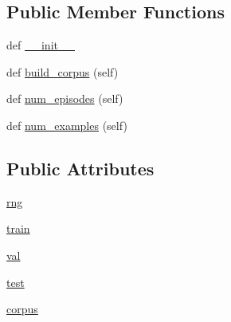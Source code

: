 \subsection*{Public Member Functions}
\begin{DoxyCompactItemize}
\item 
def \hyperlink{classparlai_1_1tasks_1_1integration__tests_1_1agents_1_1CandidateBaseTeacher_a0b4a597b51cf2901e3af2dc59c41f137}{\+\_\+\+\_\+init\+\_\+\+\_\+}
\item 
def \hyperlink{classparlai_1_1tasks_1_1integration__tests_1_1agents_1_1CandidateBaseTeacher_acc36b2f9fb42b69b2e0da43f398fdb47}{build\+\_\+corpus} (self)
\item 
def \hyperlink{classparlai_1_1tasks_1_1integration__tests_1_1agents_1_1CandidateBaseTeacher_aea8447f8dee0c3e60e0f4a444a01e239}{num\+\_\+episodes} (self)
\item 
def \hyperlink{classparlai_1_1tasks_1_1integration__tests_1_1agents_1_1CandidateBaseTeacher_afff9316bcd22ef04a25e4325cedd2ba8}{num\+\_\+examples} (self)
\end{DoxyCompactItemize}
\subsection*{Public Attributes}
\begin{DoxyCompactItemize}
\item 
\hyperlink{classparlai_1_1tasks_1_1integration__tests_1_1agents_1_1CandidateBaseTeacher_a699eabf88ee7fb37dd9b3ba8c4063767}{rng}
\item 
\hyperlink{classparlai_1_1tasks_1_1integration__tests_1_1agents_1_1CandidateBaseTeacher_a5d675561a479866e7fea8ba46d703745}{train}
\item 
\hyperlink{classparlai_1_1tasks_1_1integration__tests_1_1agents_1_1CandidateBaseTeacher_a1c0f73c0e8e5137f9458a7ce9863a7b6}{val}
\item 
\hyperlink{classparlai_1_1tasks_1_1integration__tests_1_1agents_1_1CandidateBaseTeacher_a7667cabd8cd90f2c8ef775d651cb7e2e}{test}
\item 
\hyperlink{classparlai_1_1tasks_1_1integration__tests_1_1agents_1_1CandidateBaseTeacher_ac9d199cb1f5ba5c505b65248d7f72982}{corpus}
\end{DoxyCompactItemize}
